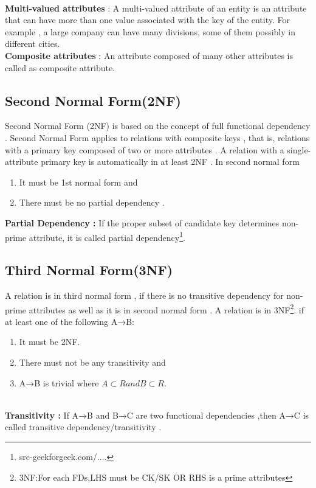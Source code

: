 \\
\noindent
 \textbf{Multi-valued attributes} : A multi-valued attribute of an entity is an attribute that can have more than one value associated with the key of the entity. For example , a large company can have many divisions, some of them possibly in different cities.
 \\
\noindent 
\textbf{Composite attributes} : An attribute composed of many other attributes is called as composite attribute.
 \\
 
 \subsection{Second Normal Form(2NF)}
 Second Normal Form (2NF) is based on the concept of full functional dependency . Second Normal Form applies to relations with composite keys , that is, relations with a primary key composed of two or more attributes . A relation with a single-attribute primary key is automatically in at least 2NF .
 In second normal form
 \begin{enumerate}
     \item It must be 1st normal form and
     \item There must be no  partial dependency .
\end{enumerate}
\noindent     
 \textbf{Partial Dependency : }If the proper subset of candidate key determines non-prime attribute, it is called partial dependency\footnote{src-geekforgeek.com/....}.
  
 \subsection{Third Normal Form(3NF)}
 A relation is in third normal form , if there is no transitive dependency for non-prime attributes as well as it is in second normal form .
A relation is in 3NF\footnote{3NF:For each FDs,LHS must be CK/SK OR RHS is a prime attributes }. if at least one of the following A→B:
  \begin{enumerate}
  
 \item It must be 2NF.
 \item There must not be any transitivity and
\item A→B is trivial where $ A \subset R and B \subset R $.
\end{enumerate}
 \\
 \textbf{Transitivity : } If A→B and B→C are two functional dependencies  ,then A→C is called transitive dependency/transitivity . 
 \\
